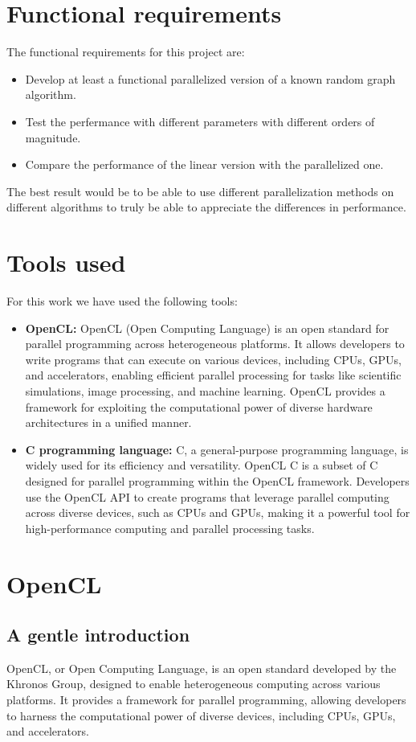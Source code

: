 \documentclass[titlepage]{article}
\begin{document}
\section{Functional requirements}
The functional requirements for this project are:
\begin{itemize}
    \item Develop at least a functional parallelized version of a known random graph algorithm.
    \item Test the perfermance with different parameters with different orders of magnitude.
    \item Compare the performance of the linear version with the parallelized one.
\end{itemize}

The best result would be to be able to use different parallelization methods on different algorithms to truly be able to appreciate the differences in performance.

\section{Tools used}
For this work we have used the following tools:
\begin{itemize}
    \item \textbf{OpenCL:} OpenCL (Open Computing Language) is an open standard for parallel programming across heterogeneous platforms. It allows developers to write programs that can execute on various devices, including CPUs, GPUs, and accelerators, enabling efficient parallel processing for tasks like scientific simulations, image processing, and machine learning. OpenCL provides a framework for exploiting the computational power of diverse hardware architectures in a unified manner.
    \item \textbf{C programming language:} C, a general-purpose programming language, is widely used for its efficiency and versatility. OpenCL C is a subset of C designed for parallel programming within the OpenCL framework. Developers use the OpenCL API to create programs that leverage parallel computing across diverse devices, such as CPUs and GPUs, making it a powerful tool for high-performance computing and parallel processing tasks.
\end{itemize}

\section{OpenCL}
\subsection{A gentle introduction}
OpenCL, or Open Computing Language, is an open standard developed by the Khronos Group, designed to enable heterogeneous computing across various platforms. It provides a framework for parallel programming, allowing developers to harness the computational power of diverse devices, including CPUs, GPUs, and accelerators.
\end{document}
